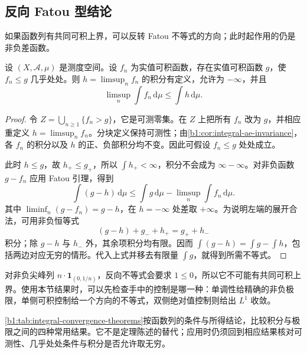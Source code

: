 \subsection{反向 Fatou 型结论}
\label{b1:subsec:050304}

如果函数列有共同可积上界，可以反转 Fatou 不等式的方向；此时起作用的仍是非负差函数。

\begin{proposition}[反向 Fatou]\label{b1:prop:reverse-fatou}
设 \((X,\mathcal A,\mu)\) 是测度空间。设 \(f_n\) 为实值可积函数，存在实值可积函数 \(g\)，使 \(f_n\leq g\) 几乎处处。则 \(h=\limsup_n f_n\) 的积分有定义，允许为 \(-\infty\)，并且
\[
\limsup_n\int f_n\,\mathrm d\mu\leq\int h\,\mathrm d\mu.
\]
\end{proposition}
\begin{proof}
令 \(Z=\bigcup_{n\geq1}\{f_n>g\}\)，它是可测零集。在 \(Z\) 上把所有 \(f_n\) 改为 \(g\)，并相应重定义 \(h=\limsup_n f_n\)。分块定义保持可测性；由\cref{b1:cor:integral-ae-invariance}，各 \(f_n\) 的积分以及 \(h\) 的正、负部积分均不变。因此可假设 \(f_n\leq g\) 处处成立。

此时 \(h\leq g\)，故 \(h_+\leq g_+\)，所以 \(\int h_+<\infty\)，积分不会成为 \(\infty-\infty\)。对非负函数 \(g-f_n\) 应用 Fatou 引理，得到
\[
\int(g-h)\,\mathrm d\mu
\leq\int g\,\mathrm d\mu-\limsup_n\int f_n\,\mathrm d\mu.
\]
其中 \(\liminf_n(g-f_n)=g-h\)，在 \(h=-\infty\) 处差取 \(+\infty\)。为说明左端的展开合法，可用非负恒等式
\[
(g-h)+g_-+h_+=g_++h_-
\]
积分；除 \(g-h\) 与 \(h_-\) 外，其余项积分均有限。因而
\(\int(g-h)=\int g-\int h\)，包括两边对应无穷的情形。代入上式并移去有限量 \(\int g\)，就得到所需不等式。
\end{proof}

对非负尖峰列 \(n\cdot\mathbf1_{(0,1/n)}\)，反向不等式会要求 \(1\leq0\)，所以它不可能有共同可积上界。使用本节结果时，可以先检查手中的控制是哪一种：单调性给精确的非负极限，单侧可积控制给一个方向的不等式，双侧绝对值控制则给出 \(L^1\) 收敛。

\ProseParagraphBreak

\cref{b1:tab:integral-convergence-theorems}按函数列的条件与所得结论，比较积分与极限之间的四种常用结果。它不是定理陈述的替代；应用时仍须回到相应结果核对可测性、几乎处处条件与积分是否允许取无穷。

